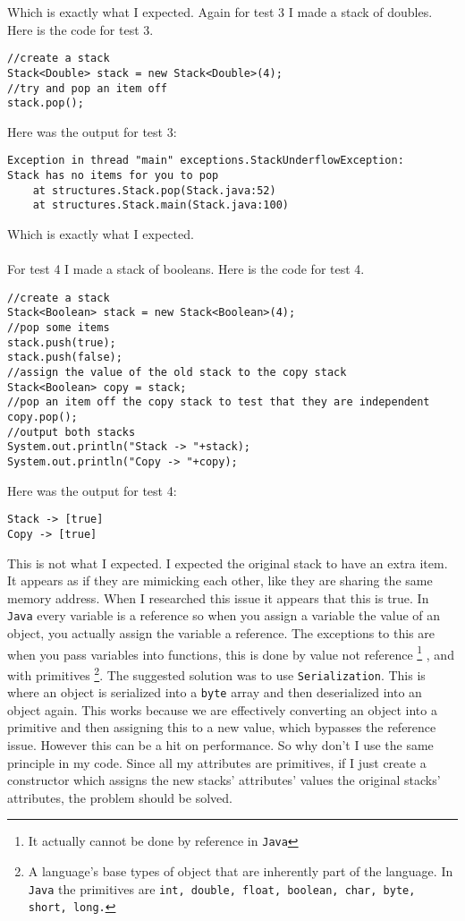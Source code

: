 \documentclass[../../../../../main.tex]{subfiles}
\begin{document}
Which is exactly what I expected.
\newpage
\noindent
Again for test 3 I made a stack of doubles. Here is the code for test 3.
\begin{verbatim}
//create a stack
Stack<Double> stack = new Stack<Double>(4);
//try and pop an item off
stack.pop();
\end{verbatim}
Here was the output for test 3:
\begin{verbatim}
Exception in thread "main" exceptions.StackUnderflowException:
Stack has no items for you to pop
	at structures.Stack.pop(Stack.java:52)
	at structures.Stack.main(Stack.java:100)
\end{verbatim}
Which is exactly what I expected.\\ \\
For test 4 I made a stack of booleans. Here is the code for test 4.
\begin{verbatim}
//create a stack
Stack<Boolean> stack = new Stack<Boolean>(4);
//pop some items
stack.push(true);
stack.push(false);
//assign the value of the old stack to the copy stack 
Stack<Boolean> copy = stack;
//pop an item off the copy stack to test that they are independent
copy.pop();
//output both stacks
System.out.println("Stack -> "+stack);
System.out.println("Copy -> "+copy);
\end{verbatim}
Here was the output for test 4:
\begin{verbatim}
Stack -> [true]
Copy -> [true]
\end{verbatim}
This is not what I expected. I expected the original stack to have an extra item. It appears as if they are mimicking each other, like they are sharing the same memory address. When I researched this issue\cite{duplicationJava} it appears that this is true. In \texttt{Java} every variable is a reference so when you assign a variable the value of an object, you actually assign the variable a reference. The exceptions to this are when you pass variables into functions, this is done by value not reference
\footnote{It actually cannot be done by reference in \texttt{Java}}
, and with primitives
\footnote{A language's base types of object that are inherently part of the language. In \texttt{Java} the primitives are \texttt{int, double, float, boolean, char, byte, short, long.}}.
The suggested solution was to use \texttt{Serialization\cite{serialize}}. This is where an object is serialized into a \texttt{byte} array and then deserialized into an object again. This works because we are effectively converting an object into a primitive and then assigning this to a new value, which bypasses the reference issue. However this can be a hit on performance. So why don't I use the same principle in my code. Since all my attributes are primitives, if I just create a constructor which assigns the new stacks' attributes' values the original stacks' attributes, the problem should be solved.
\end{document}
